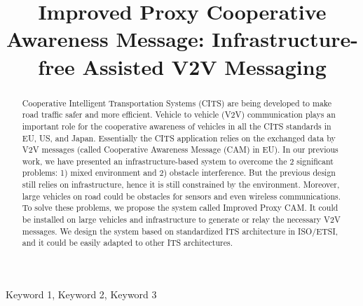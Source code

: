\documentclass[conference,twocolumn]{IEEEtran}
\begin{document}
\title{Improved Proxy Cooperative Awareness Message: Infrastructure-free Assisted V2V Messaging}
\author{
}

\maketitle

\begin{abstract}
Cooperative Intelligent Transportation Systems
(CITS) are being developed to make road traffic safer and more efficient.
Vehicle to vehicle (V2V) communication plays an important role for the cooperative
awareness of vehicles in all the CITS standards in EU, US, and Japan.
Essentially the CITS application relies on the exchanged data by V2V messages (called Cooperative Awareness Message (CAM) in EU).
In our previous work, we have presented an infrastructure-based system to overcome the 2 significant problems:
1) mixed environment and 2) obstacle interference.
But the previous design still relies on infrastructure, hence it is still constrained by the environment.
Moreover, large vehicles on road could be obstacles for sensors and even wireless communications.
To solve these problems, we propose the system called Improved Proxy CAM.
It could be installed on large vehicles and infrastructure to generate or relay the necessary V2V messages.
We design the system based on standardized ITS architecture in ISO/ETSI, and it could be easily adapted to other ITS architectures.
\end{abstract}

\begin{IEEEkeywords}
 Keyword 1, Keyword 2, Keyword 3
\end{IEEEkeywords}









\end{document}
